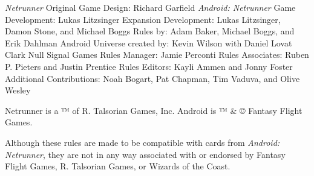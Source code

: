 \documentclass{article}
\begin{document}
\begin{outline}[enumerate]
\1 \emph{Netrunner} Original Game Design: Richard Garfield
\1 \emph{Android: Netrunner}
  \2 Game Development: Lukas Litzsinger
  \2 Expansion Development: Lukas Litzsinger, Damon Stone, and Michael Boggs
  \2 Rules by: Adam Baker, Michael Boggs, and Erik Dahlman
  \2 Android Universe created by: Kevin Wilson with Daniel Lovat Clark
\1 Null Signal Games
  \2 Rules Manager: Jamie Perconti
  \2 Rules Associates: Ruben P. Pieters and Justin Prentice
  \2 Rules Editors: Kayli Ammen and Jonny Foster
  \2 Additional Contributions: Noah Bogart, Pat Chapman, Tim Vaduva, and Olive Wesley
\end{outline}

\noindent
Netrunner is a ™ of R. Talsorian Games, Inc. Android is ™ \& © Fantasy Flight Games.

\noindent
Although these rules are made to be compatible with cards from \emph{Android: Netrunner}, they are not in any way associated with or endorsed by Fantasy Flight Games, R. Talsorian Games, or Wizards of the Coast.
\end{document}
